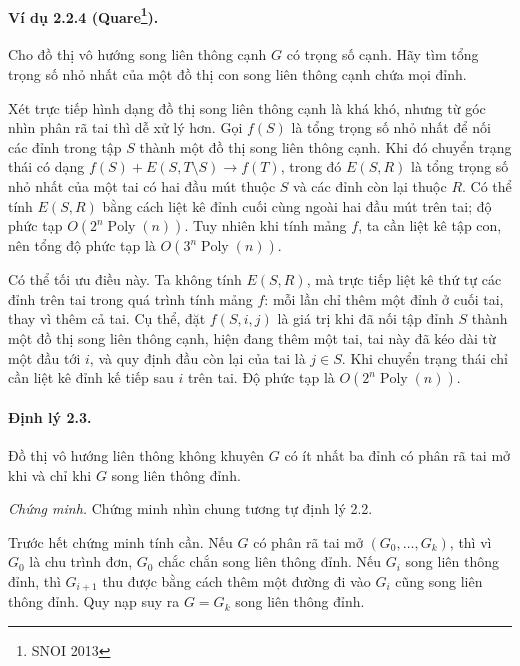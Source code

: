 \documentclass[11pt]{article}
\begin{document}
\paragraph{Ví dụ 2.2.4 (Quare\protect\footnote{SNOI 2013}).}
Cho đồ thị vô hướng song liên thông cạnh $G$ có trọng số cạnh. Hãy tìm tổng
trọng số nhỏ nhất của một đồ thị con song liên thông cạnh chứa mọi đỉnh.

Xét trực tiếp hình dạng đồ thị song liên thông cạnh là khá khó, nhưng từ góc nhìn
phân rã tai thì dễ xử lý hơn. Gọi $f(S)$ là tổng trọng số nhỏ nhất để nối các
đỉnh trong tập $S$ thành một đồ thị song liên thông cạnh. Khi đó chuyển trạng
thái có dạng $f(S)+E(S,T\setminus S)\to f(T)$, trong đó $E(S,R)$ là tổng trọng
số nhỏ nhất của một tai có hai đầu mút thuộc $S$ và các đỉnh còn lại thuộc $R$.
Có thể tính $E(S,R)$ bằng cách liệt kê đỉnh cuối cùng ngoài hai đầu mút trên tai;
độ phức tạp $O(2^n\operatorname{Poly}(n))$. Tuy nhiên khi tính mảng $f$, ta cần
liệt kê tập con, nên tổng độ phức tạp là $O(3^n\operatorname{Poly}(n))$.

Có thể tối ưu điều này. Ta không tính $E(S,R)$, mà trực tiếp liệt kê thứ tự các
đỉnh trên tai trong quá trình tính mảng $f$: mỗi lần chỉ thêm một đỉnh ở cuối
tai, thay vì thêm cả tai. Cụ thể, đặt $f(S,i,j)$ là giá trị khi đã nối tập đỉnh
$S$ thành một đồ thị song liên thông cạnh, hiện đang thêm một tai, tai này đã
kéo dài từ một đầu tới $i$, và quy định đầu còn lại của tai là $j\in S$. Khi
chuyển trạng thái chỉ cần liệt kê đỉnh kế tiếp sau $i$ trên tai. Độ phức tạp là
$O(2^n\operatorname{Poly}(n))$.

\paragraph{Định lý 2.3.}
Đồ thị vô hướng liên thông không khuyên $G$ có ít nhất ba đỉnh có phân rã tai mở
khi và chỉ khi $G$ song liên thông đỉnh.

\emph{Chứng minh.}
Chứng minh nhìn chung tương tự định lý 2.2.

Trước hết chứng minh tính cần. Nếu $G$ có phân rã tai mở $(G_0,\ldots,G_k)$, thì
vì $G_0$ là chu trình đơn, $G_0$ chắc chắn song liên thông đỉnh. Nếu $G_i$ song
liên thông đỉnh, thì $G_{i+1}$ thu được bằng cách thêm một đường đi vào $G_i$
cũng song liên thông đỉnh. Quy nạp suy ra $G=G_k$ song liên thông đỉnh.
\end{document}
